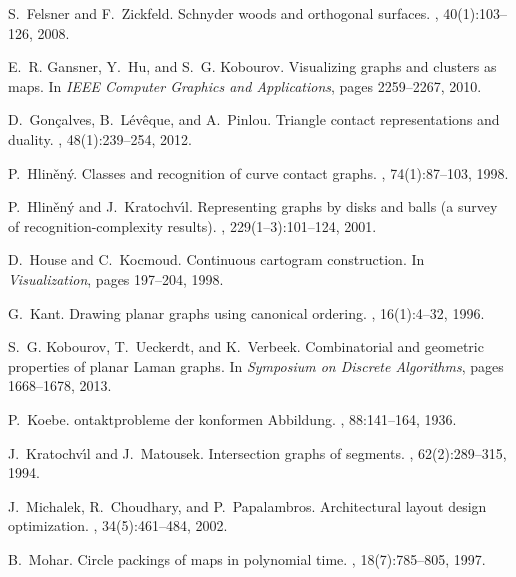 \documentclass{article}
\begin{document}
\begin{thebibliography}{10}
S.~Felsner and F.~Zickfeld.
\newblock Schnyder woods and orthogonal surfaces.
, 40(1):103--126, 2008.

E.~R. Gansner, Y.~Hu, and S.~G. Kobourov.
\newblock Visualizing graphs and clusters as maps.
\newblock In {\em IEEE Computer Graphics and Applications}, pages 2259--2267,
  2010.

D.~Gon\c{c}alves, B.~L{\'e}v{\^e}que, and A.~Pinlou.
\newblock Triangle contact representations and duality.
, 48(1):239--254, 2012.

P.~Hlin\v{e}n\'{y}.
\newblock Classes and recognition of curve contact graphs.
, 74(1):87--103, 1998.

P.~Hlin\v{e}n\'{y} and J.~Kratochv{\'\i}l.
\newblock Representing graphs by disks and balls (a survey of
  recognition-complexity results).
, 229(1--3):101--124, 2001.

D.~House and C.~Kocmoud.
\newblock Continuous cartogram construction.
\newblock In {\em Visualization}, pages 197--204, 1998.

G.~Kant.
\newblock Drawing planar graphs using canonical ordering.
, 16(1):4--32, 1996.

S.~G. Kobourov, T.~Ueckerdt, and K.~Verbeek.
\newblock Combinatorial and geometric properties of planar {L}aman graphs.
\newblock In {\em Symposium on Discrete Algorithms}, pages 1668--1678, 2013.

P.~Koebe.
ontaktprobleme der konformen {A}bbildung.
, 88:141--164, 1936.

J.~Kratochv{\'\i}l and J.~Matousek.
\newblock Intersection graphs of segments.
, 62(2):289--315, 1994.

J.~Michalek, R.~Choudhary, and P.~Papalambros.
\newblock Architectural layout design optimization.
, 34(5):461--484, 2002.

B.~Mohar.
\newblock Circle packings of maps in polynomial time.
, 18(7):785--805, 1997.


\end{thebibliography}
\end{document}
